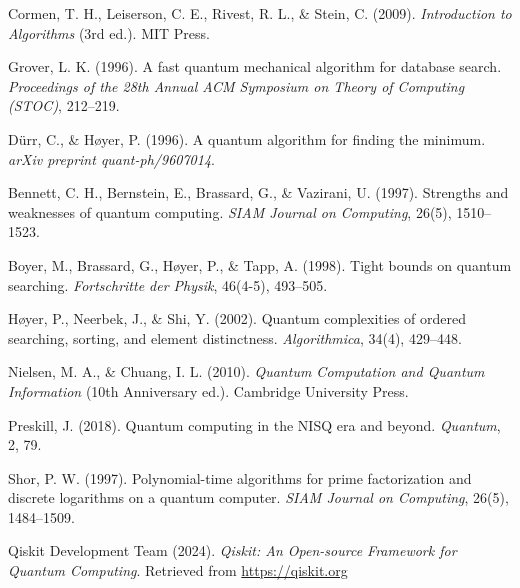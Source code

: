 \documentclass[12pt,a4paper]{article}
\theoremstyle{definition}
\theoremstyle{remark}
\begin{document}
\begin{thebibliography}{99}

Cormen, T. H., Leiserson, C. E., Rivest, R. L., \& Stein, C. (2009).
\textit{Introduction to Algorithms} (3rd ed.).
MIT Press.

Grover, L. K. (1996).
A fast quantum mechanical algorithm for database search.
\textit{Proceedings of the 28th Annual ACM Symposium on Theory of Computing (STOC)}, 212--219.

Dürr, C., \& Høyer, P. (1996).
A quantum algorithm for finding the minimum.
\textit{arXiv preprint quant-ph/9607014}.

Bennett, C. H., Bernstein, E., Brassard, G., \& Vazirani, U. (1997).
Strengths and weaknesses of quantum computing.
\textit{SIAM Journal on Computing}, 26(5), 1510--1523.

Boyer, M., Brassard, G., Høyer, P., \& Tapp, A. (1998).
Tight bounds on quantum searching.
\textit{Fortschritte der Physik}, 46(4-5), 493--505.

Høyer, P., Neerbek, J., \& Shi, Y. (2002).
Quantum complexities of ordered searching, sorting, and element distinctness.
\textit{Algorithmica}, 34(4), 429--448.

Nielsen, M. A., \& Chuang, I. L. (2010).
\textit{Quantum Computation and Quantum Information} (10th Anniversary ed.).
Cambridge University Press.

Preskill, J. (2018).
Quantum computing in the NISQ era and beyond.
\textit{Quantum}, 2, 79.

Shor, P. W. (1997).
Polynomial-time algorithms for prime factorization and discrete logarithms on a quantum computer.
\textit{SIAM Journal on Computing}, 26(5), 1484--1509.

Qiskit Development Team (2024).
\textit{Qiskit: An Open-source Framework for Quantum Computing}.
Retrieved from \url{https://qiskit.org}

\end{thebibliography}
\end{document}
